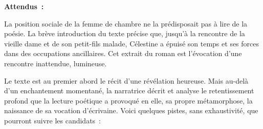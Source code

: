 {\textbf{Attendus~:}

La position sociale de la femme de chambre ne la prédisposait pas à lire de la poésie.
La brève introduction du texte précise que, jusqu'à la rencontre de la vieille dame et
de son petit-fils malade, Célestine a épuisé son temps et ses forces dans des
occupations ancillaires. Cet extrait du roman est l'évocation d'une rencontre
inattendue, lumineuse.

Le texte est au premier abord le récit d'une révélation heureuse. Mais au-delà d'un
enchantement momentané, la narratrice décrit et analyse le retentissement profond
que la lecture poétique a provoqué en elle, sa propre métamorphose, la naissance de
sa vocation d'écrivaine. Voici quelques pistes, sans exhaustivité, que pourront suivre
les candidats~:

}
